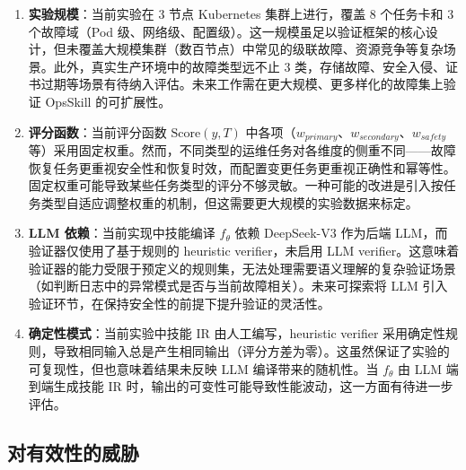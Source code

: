\documentclass[11pt,a4paper]{ctexart}
\begin{document}
\begin{enumerate}[leftmargin=2em]
  \item \textbf{实验规模}：当前实验在 3 节点 Kubernetes 集群上进行，覆盖 8 个任务卡和 3 个故障域（Pod 级、网络级、配置级）。这一规模虽足以验证框架的核心设计，但未覆盖大规模集群（数百节点）中常见的级联故障、资源竞争等复杂场景。此外，真实生产环境中的故障类型远不止 3 类，存储故障、安全入侵、证书过期等场景有待纳入评估。未来工作需在更大规模、更多样化的故障集上验证 OpsSkill 的可扩展性。

  \item \textbf{评分函数}：当前评分函数 $\text{Score}(y, T)$ 中各项（$w_{primary}$、$w_{secondary}$、$w_{safety}$ 等）采用固定权重。然而，不同类型的运维任务对各维度的侧重不同——故障恢复任务更重视安全性和恢复时效，而配置变更任务更重视正确性和幂等性。固定权重可能导致某些任务类型的评分不够灵敏。一种可能的改进是引入按任务类型自适应调整权重的机制，但这需要更大规模的实验数据来标定。

  \item \textbf{LLM 依赖}：当前实现中技能编译 $f_\theta$ 依赖 DeepSeek-V3 作为后端 LLM，而验证器仅使用了基于规则的 heuristic verifier，未启用 LLM verifier。这意味着验证器的能力受限于预定义的规则集，无法处理需要语义理解的复杂验证场景（如判断日志中的异常模式是否与当前故障相关）。未来可探索将 LLM 引入验证环节，在保持安全性的前提下提升验证的灵活性。

  \item \textbf{确定性模式}：当前实验中技能 IR 由人工编写，heuristic verifier 采用确定性规则，导致相同输入总是产生相同输出（评分方差为零）。这虽然保证了实验的可复现性，但也意味着结果未反映 LLM 编译带来的随机性。当 $f_\theta$ 由 LLM 端到端生成技能 IR 时，输出的可变性可能导致性能波动，这一方面有待进一步评估。
\end{enumerate}

\subsection{对有效性的威胁}
\end{document}
